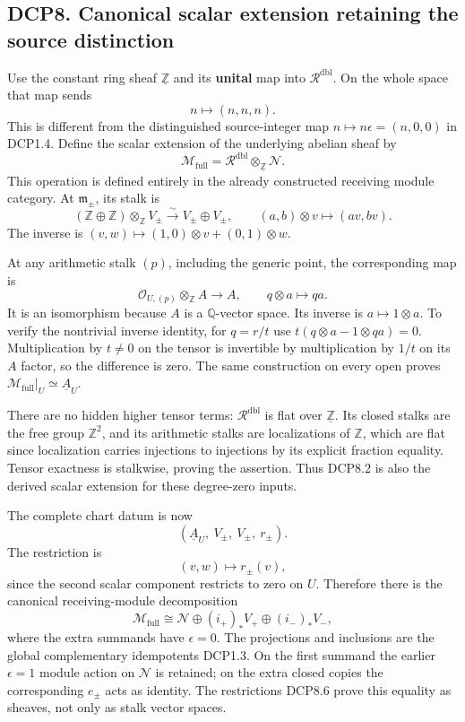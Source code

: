 \subsection{DCP8. Canonical scalar extension retaining the source
distinction}\label{dcp8.-canonical-scalar-extension-retaining-the-source-distinction}

Use the constant ring sheaf \(\underline{\mathbb Z}\) and its
\textbf{unital} map into \(\mathcal R^{\mathrm{dbl}}\). On the whole
space that map sends \[
 n\longmapsto(n,n,n).
\tag{DCP8.1}
\] This is different from the distinguished source-integer map
\(n\mapsto n\epsilon=(n,0,0)\) in DCP1.4. Define the scalar extension of
the underlying abelian sheaf by \[
 \mathcal M_{\mathrm{full}}
 =\mathcal R^{\mathrm{dbl}}\otimes_{\underline{\mathbb Z}}\mathcal N.
\tag{DCP8.2}
\] This operation is defined entirely in the already constructed
receiving module category. At \(\mathfrak m_\pm\), its stalk is \[
 (\mathbb Z\oplus\mathbb Z)\otimes_{\mathbb Z}V_\pm
 \xrightarrow{\sim}V_\pm\oplus V_\pm,\qquad
 (a,b)\otimes v\longmapsto(av,bv).
\tag{DCP8.3}
\] The inverse is \((v,w)\mapsto(1,0)\otimes v+(0,1)\otimes w\).

At any arithmetic stalk \((p)\), including the generic point, the
corresponding map is \[
 \mathcal O_{U,(p)}\otimes_{\mathbb Z}A\longrightarrow A,\qquad
 q\otimes a\longmapsto qa.
\tag{DCP8.4}
\] It is an isomorphism because \(A\) is a \(\mathbb Q\)-vector space.
Its inverse is \(a\mapsto1\otimes a\). To verify the nontrivial inverse
identity, for \(q=r/t\) use \(t(q\otimes a-1\otimes qa)=0\).
Multiplication by \(t\ne0\) on the tensor is invertible by
multiplication by \(1/t\) on its \(A\) factor, so the difference is
zero. The same construction on every open proves
\(\mathcal M_{\mathrm{full}}|_U\simeq\underline A_U\).

There are no hidden higher tensor terms: \(\mathcal R^{\mathrm{dbl}}\)
is flat over \(\underline{\mathbb Z}\). Its closed stalks are the free
group \(\mathbb Z^2\), and its arithmetic stalks are localizations of
\(\mathbb Z\), which are flat since localization carries injections to
injections by its explicit fraction equality. Tensor exactness is
stalkwise, proving the assertion. Thus DCP8.2 is also the derived scalar
extension for these degree-zero inputs.

The complete chart datum is now \[
 (\underline A_U,\ V_\pm,\ V_\pm,\ r_\pm).
\tag{DCP8.5}
\] The restriction is \[
 (v,w)\longmapsto r_\pm(v),
\tag{DCP8.6}
\] since the second scalar component restricts to zero on \(U\).
Therefore there is the canonical receiving-module decomposition \[
 \boxed{
 \mathcal M_{\mathrm{full}}
 \cong\mathcal N\oplus(i_+)_*V_+\oplus(i_-)_*V_- ,
 }
\tag{DCP8.7}
\] where the extra summands have \(\epsilon=0\). The projections and
inclusions are the global complementary idempotents DCP1.3. On the first
summand the earlier \(\epsilon=1\) module action on \(\mathcal N\) is
retained; on the extra closed copies the corresponding \(e_\pm\) acts as
identity. The restrictions DCP8.6 prove this equality as sheaves, not
only as stalk vector spaces.

